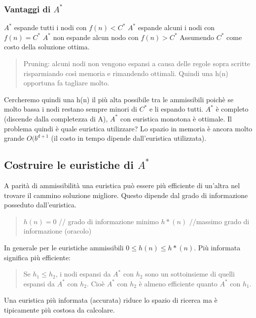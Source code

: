 \documentclass{article}
\begin{document}
\subsubsection{Vantaggi di $A^*$}
$A^*$ espande tutti i nodi con $f(n) < C^*$ \newline
$A^*$ espande alcuni i nodi con $f(n) = C^*$ \newline
$A^*$ non espande alcun nodo con $f(n) > C^*$ \newline
Assumendo $C^*$ come costo della soluzione ottima.
\begin{quote}
    Pruning: alcuni nodi non vengono espansi a causa delle regole sopra scritte risparmiando così memoria e rimandendo ottimali. Quindi una h(n) opportuna fa tagliare molto.
\end{quote}
Cercheremo quindi una h(n) il più alta possibile tra le ammissibili poichè se molto bassa i nodi restano sempre minori di $C^*$ e li espando tutti. \newline
$A^*$ è completo (discende dalla completezza di A), $A^*$ con euristica monotona è ottimale. Il problema quindi è quale euristica utilizzare? Lo spazio in memoria è ancora molto grande $O(b^{d+1}$ (il costo in tempo dipende dall'euristica utilizzata). 

\subsection{Costruire le euristiche di $A^*$}
A parità di ammissibilità una euristica può essere più efficiente di un'altra nel trovare il cammino soluzione migliore. Questo dipende dal grado di informazione posseduto dall'euristica.
\begin{quote}
    $h(n) = 0$ // grado di informazione minimo \newline
    $h*(n)$ //massimo grado di informazione (oracolo)
\end{quote}
In generale per le euristiche ammissibili $0 \leq h(n) \leq h*(n)$. \newline
Più informata significa più efficiente:
\begin{quote}
    Se $h_1 \leq h_2$, i nodi espansi da $A^*$ con $h_2$ sono un sottoinsieme di quelli espansi da $A^*$ con $h_2$. Cioè $A^*$ con $h_2$ è almeno efficiente quanto $A^*$ con $h_1$.
\end{quote}
Una euristica più informata (accurata) riduce lo spazio di ricerca ma è tipicamente più costosa da calcolare. 
\end{document}
